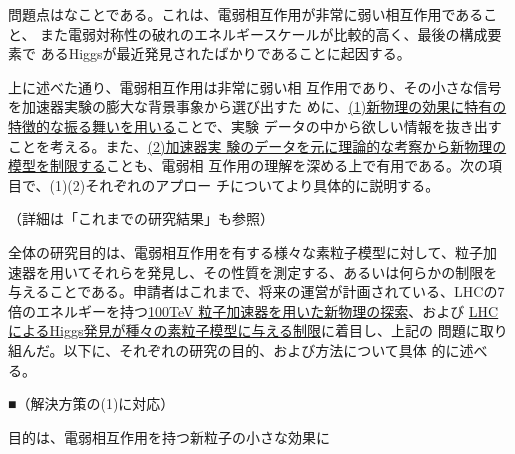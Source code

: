 \documentclass[11pt,a4paper,twoside,dvipdfmx]{jarticle}		%
\newcommand{\研究課題名}{粒子加速器を用いた電弱相互作用を持つ新物理の探索}
\newcommand{\研究機関名}{東京大学}
\newcommand{\申請者氏名}{千草颯}
\newcommand{\研究代表者氏名}{\申請者氏名}
\newcommand{\研究期間の最終元号年度}{34}	%
\begin{document}
{\pmb{\textbf{【問題点]}} 問題点はなことである。これは、電弱相互作用が非常に弱い相互作用であること、
また電弱対称性の破れのエネルギースケールが比較的高く、最後の構成要素で
あるHiggsが最近発見されたばかりであることに起因する。

\vspace*{1mm}

 上に述べた通り、電弱相互作用は非常に弱い相
互作用であり、その小さな信号を加速器実験の膨大な背景事象から選び出すた
めに、\ul{(1)新物理の効果に特有の特徴的な振る舞いを用いる}ことで、実験
データの中から欲しい情報を抜き出すことを考える。また、\ul{(2)加速器実
験のデータを元に理論的な考察から新物理の模型を制限する}ことも、電弱相
互作用の理解を深める上で有用である。次の項目で、(1)(2)それぞれのアプロー
チについてより具体的に説明する。

\vspace*{1mm}

（詳細は「これまでの研究結果」も参照）

\vspace*{1mm}

全体の研究目的は、電弱相互作用を有する様々な素粒子模型に対して、粒子加
速器を用いてそれらを発見し、その性質を測定する、あるいは何らかの制限を
与えることである。申請者はこれまで、将来の運営が計画されている、LHCの7
倍のエネルギーを持つ\ul{100TeV 粒子加速器を用いた新物理の探索}、および
\ul{LHCによるHiggs発見が種々の素粒子模型に与える制限}に着目し、上記の
問題に取り組んだ。以下に、それぞれの研究の目的、および方法について具体
的に述べる。

\vspace*{1mm}

■（解決方策の(1)に対応）

目的は、電弱相互作用を持つ新粒子の小さな効果に


\vspace*{1mm}



\vspace*{1mm}


\vspace*{1mm}

}
\end{document}
